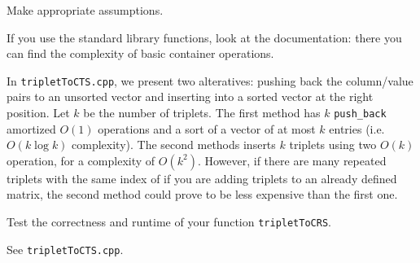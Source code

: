 \begin{problem}
\begin{subproblem}[3]
  \begin{hint}
   Make appropriate assumptions.
  \end{hint}
  
  \begin{hint}
   If you use the \Cpp{} standard library functions, look at the documentation: there you can find the complexity of basic container operations.
  \end{hint}
  
  \begin{solution}
  In \texttt{tripletToCTS.cpp}, we present two alteratives: pushing back the column/value pairs to an unsorted vector and inserting into a sorted vector at the right position.
  Let $k$ be the number of triplets. The first method has $k$ \texttt{push\_back} amortized $O(1)$ operations and a sort of a vector of at most $k$ entries (i.e. $O(k \log k)$ complexity). The second methods inserts $k$ triplets using two $O(k)$  operation, for a complexity of $O(k^2)$.
  However, if there are many repeated triplets with the same index of if you are adding triplets to an already defined matrix, the second method could prove to be less expensive than the first one.
  \end{solution}


 \end{subproblem}

 \begin{subproblem}[1]
  Test the correctness and runtime of your function \verb|tripletToCRS|.
 \end{subproblem}

 \begin{solution}
  See \texttt{tripletToCTS.cpp}.
 \end{solution}
 
\end{problem}
 
